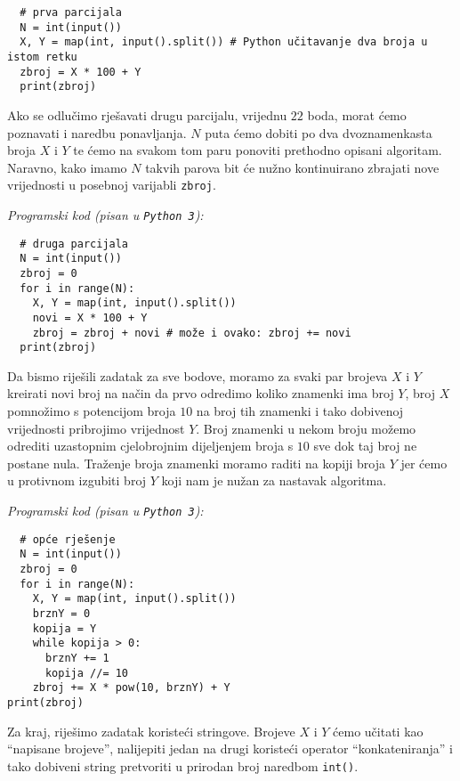 \documentclass[a4paper]{article}
\begin{document}
\vspace{-2ex}
\begin{verbatim}
  # prva parcijala
  N = int(input())
  X, Y = map(int, input().split()) # Python učitavanje dva broja u istom retku
  zbroj = X * 100 + Y
  print(zbroj)
\end{verbatim}

Ako se odlučimo rješavati drugu parcijalu, vrijednu $22$ boda, morat ćemo
poznavati i naredbu ponavljanja. $N$ puta ćemo dobiti po dva dvoznamenkasta
broja $X$ i $Y$ te ćemo na svakom tom paru ponoviti prethodno opisani algoritam.
Naravno, kako imamo $N$ takvih parova bit će nužno kontinuirano zbrajati nove
vrijednosti u posebnoj varijabli \texttt{zbroj}.

\clearpage

\textit{Programski kod (pisan u \texttt{Python 3}):}

\vspace{-2ex}
\begin{verbatim}
  # druga parcijala
  N = int(input())
  zbroj = 0
  for i in range(N):
    X, Y = map(int, input().split())
    novi = X * 100 + Y
    zbroj = zbroj + novi # može i ovako: zbroj += novi
  print(zbroj)
\end{verbatim}

Da bismo riješili zadatak za sve bodove, moramo za svaki par brojeva $X$ i $Y$
kreirati novi broj na način da prvo odredimo koliko znamenki ima broj $Y$, broj
$X$ pomnožimo s potencijom broja $10$ na broj tih znamenki i tako dobivenoj
vrijednosti pribrojimo vrijednost $Y$. Broj znamenki u nekom broju možemo
odrediti uzastopnim cjelobrojnim dijeljenjem broja s $10$ sve dok taj broj ne
postane nula. Traženje broja znamenki moramo raditi na kopiji broja $Y$
jer ćemo u protivnom izgubiti broj $Y$ koji nam je nužan za nastavak algoritma.

\textit{Programski kod (pisan u \texttt{Python 3}):}

\vspace{-2ex}
\begin{verbatim}
  # opće rješenje
  N = int(input())
  zbroj = 0
  for i in range(N):
    X, Y = map(int, input().split())
    brznY = 0
    kopija = Y
    while kopija > 0:
      brznY += 1
      kopija //= 10
    zbroj += X * pow(10, brznY) + Y
print(zbroj)
\end{verbatim}

Za kraj, riješimo zadatak koristeći stringove. Brojeve $X$ i $Y$ ćemo učitati
kao ``napisane brojeve'', nalijepiti jedan na drugi koristeći operator
``konkateniranja'' i tako dobiveni string pretvoriti u prirodan broj naredbom
\texttt{int()}.
\end{document}
